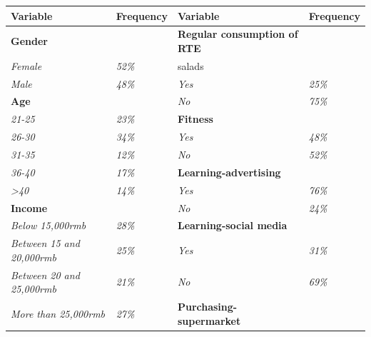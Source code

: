 \documentclass[a4,12pt]{article}
\begin{document}
\begin{table}[H]
\center
\begin{tabular}{l|l|l|l}
\hline
\textbf{Variable}                 & \textbf{Frequency} & \textbf{Variable}                              & \textbf{Frequency} \\ \hline
\textbf{Gender}                   & \textit{}          & \textbf{Regular consumption of RTE}            & \textit{}          \\ \hline
\textit{Female}                   & \textit{52\%}      & salads                                         & \textit{}          \\ \hline
\textit{Male}                     & \textit{48\%}      & \textit{Yes}                                   & \textit{25\%}      \\ \hline
\textbf{Age}                      & \textit{}          & \textit{No}                                    & \textit{75\%}      \\ \hline
\textit{21-25}                    & \textit{23\%}      & \textbf{Fitness}                               & \textit{}          \\ \hline
\textit{26-30}                    & \textit{34\%}      & \textit{Yes}                                   & \textit{48\%}      \\ \hline
\textit{31-35}                    & \textit{12\%}      & \textit{No}                                    & \textit{52\%}      \\ \hline
\textit{36-40}                    & \textit{17\%}      & \textbf{Learning-advertising}        &                    \\ \hline
\textit{\textgreater{}40}         & \textit{14\%}      & \textit{Yes}                                   & \textit{76\%}      \\ \hline
\textbf{Income}                   & \textit{}          & \textit{No}                                    & \textit{24\%}      \\ \hline
\textit{Below 15,000rmb}          & \textit{28\%}      & \textbf{Learning-social media}       &                    \\ \hline
\textit{Between 15 and 20,000rmb} & \textit{25\%}      & \textit{Yes}                                   & \textit{31\%}      \\ \hline
\textit{Between 20 and 25,000rmb} & \textit{21\%}      & \textit{No}                                    & \textit{69\%}      \\ \hline
\textit{More than 25,000rmb}      & \textit{27\%}      & \textbf{Purchasing-supermarket}       & \textit{}          \\ \hline

\end{tabular}
\end{table}
\end{document}
